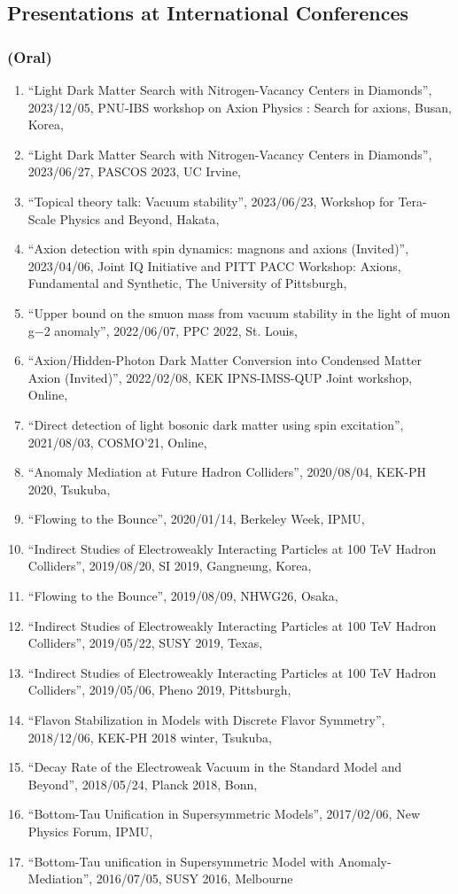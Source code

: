 \documentclass[12pt]{article}
\begin{document}
\subsection*{Presentations at International Conferences}
\subsubsection*{(Oral)}
\begin{enumerate}\item ``Light Dark Matter Search with Nitrogen-Vacancy Centers in Diamonds'', 2023/12/05, PNU-IBS workshop on Axion Physics : Search for axions, Busan, Korea,\item ``Light Dark Matter Search with Nitrogen-Vacancy Centers in Diamonds'', 2023/06/27, PASCOS 2023, UC Irvine,\item ``Topical theory talk: Vacuum stability'', 2023/06/23, Workshop for Tera-Scale Physics and Beyond, Hakata,\item ``Axion detection with spin dynamics: magnons and axions (Invited)'', 2023/04/06, Joint IQ Initiative and PITT PACC Workshop: Axions, Fundamental and Synthetic, The University of Pittsburgh,\item ``Upper bound on the smuon mass from vacuum stability in the light of muon g−2 anomaly'', 2022/06/07, PPC 2022, St. Louis,\item ``Axion/Hidden-Photon Dark Matter Conversion into Condensed Matter Axion (Invited)'', 2022/02/08, KEK IPNS-IMSS-QUP Joint workshop, Online,\item ``Direct detection of light bosonic dark matter using spin excitation'', 2021/08/03, COSMO'21, Online,\item ``Anomaly Mediation at Future Hadron Colliders'', 2020/08/04, KEK-PH 2020, Tsukuba,\item ``Flowing to the Bounce'', 2020/01/14, Berkeley Week, IPMU,\item ``Indirect Studies of Electroweakly Interacting Particles at 100 TeV Hadron Colliders'', 2019/08/20, SI 2019, Gangneung, Korea,\item ``Flowing to the Bounce'', 2019/08/09, NHWG26, Osaka,\item ``Indirect Studies of Electroweakly Interacting Particles at 100 TeV Hadron Colliders'', 2019/05/22, SUSY 2019, Texas,\item ``Indirect Studies of Electroweakly Interacting Particles at 100 TeV Hadron Colliders'', 2019/05/06, Pheno 2019, Pittsburgh,\item ``Flavon Stabilization in Models with Discrete Flavor Symmetry'', 2018/12/06, KEK-PH 2018 winter, Tsukuba,\item ``Decay Rate of the Electroweak Vacuum in the Standard Model and Beyond'', 2018/05/24, Planck 2018, Bonn,\item ``Bottom-Tau Unification in Supersymmetric Models'', 2017/02/06, New Physics Forum, IPMU,\item ``Bottom-Tau unification in Supersymmetric Model with Anomaly-Mediation'', 2016/07/05, SUSY 2016, Melbourne\end{enumerate}
\end{document}
